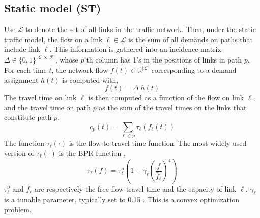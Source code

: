 

\subsection{Static model (ST)}
Use $\mathcal{L}$ to denote the set of all links in the traffic network. Then, under the static traffic model, the flow on a link $\ell\in\mathcal{L}$ is the sum of all demands on paths that include link $\ell$. This information is gathered into an incidence matrix 
$\Delta\in\{0,1\}^{|\mathcal{L}|\times|\mathcal{P}|}$, whose $p$'th column has 1's in the positions of links in path $p$. For each time $t$, the network flow $f(t)\in\mathbb{R}^{|\mathcal{L}|}$ corresponding to a demand assignment $h(t)$ is computed with,
\begin{equation}
\label{eq:staticmodel}
f(t) = \Delta \; h(t) 
\end{equation}
The travel time on link $\ell$ is then computed as a function of the flow on link $\ell$, and the travel time on path $p$ as the sum of the travel times on the links that constitute path $p$,
\begin{equation}
\label{eq:statictt}
c_p(t) = \sum_{\ell\in p} \tau_\ell(f_\ell(t))
\end{equation}
The function $\tau_\ell(\cdot)$ is the flow-to-travel time function. The most widely used version of $\tau_\ell(\cdot)$ is the BPR function \cite{wiki_Route_Choice},
\begin{equation}
\label{eq:bpr}
\tau_\ell(f) = \tau^o_\ell\left( 1 + \gamma_\ell  \left( \frac{f}{\bar{f}_\ell} \right)^4 \right)
\end{equation}
$\tau^o_\ell$ and $\bar{f}_\ell$ are respectively the free-flow travel time and the capacity of link $\ell$. $\gamma_\ell$ is a tunable parameter, typically set to 0.15 \cite{wiki_Route_Choice}.
This is a convex optimization problem.

